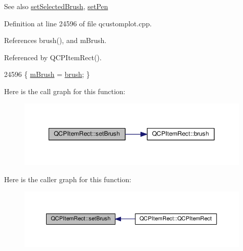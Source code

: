 \begin{DoxySeeAlso}{See also}
\hyperlink{class_q_c_p_item_rect_abd1792859844118dedee86223cede7af}{set\+Selected\+Brush}, \hyperlink{class_q_c_p_item_rect_a483c0da5a17e1646cd17ddea2c124e7d}{set\+Pen} 
\end{DoxySeeAlso}


Definition at line 24596 of file qcustomplot.\+cpp.



References brush(), and m\+Brush.



Referenced by Q\+C\+P\+Item\+Rect().


\begin{DoxyCode}
24596 \{ \hyperlink{class_q_c_p_item_rect_a2d7f207fada27588b3a52b19234d3c2e}{mBrush} = \hyperlink{class_q_c_p_item_rect_a03d2d26ffcac78b25b8e90915f9c4abe}{brush}; \}
\end{DoxyCode}


Here is the call graph for this function\+:\nopagebreak
\begin{figure}[H]
\begin{center}
\leavevmode
\includegraphics[width=349pt]{class_q_c_p_item_rect_abbd4e346a03513ee466afc25d9c75446_cgraph}
\end{center}
\end{figure}




Here is the caller graph for this function\+:\nopagebreak
\begin{figure}[H]
\begin{center}
\leavevmode
\includegraphics[width=350pt]{class_q_c_p_item_rect_abbd4e346a03513ee466afc25d9c75446_icgraph}
\end{center}
\end{figure}


